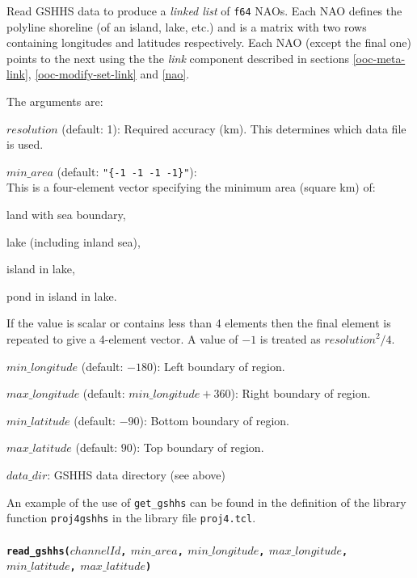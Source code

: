Read GSHHS data to produce a {\em linked list} of \texttt{f64} NAOs.
Each NAO defines the polyline shoreline (of an island, lake, etc.)
and is a matrix with two rows containing longitudes and latitudes respectively.
Each NAO (except the final one) points to the next using the
the {\em link} component described in sections
\ref{ooc-meta-link}, \ref{ooc-modify-set-link} and \ref{nao}.

The arguments are:
\begin{simpleitems}
\item $\mathit{resolution}$ (default: 1):
    Required accuracy (km).
    This determines which data file is used.
\item $\mathit{min\_area}$ (default: \texttt{"\{-1 -1 -1 -1\}"}): \\
This is a four-element vector specifying the minimum area (square km) of:
    \begin{bullets}
	\item land with sea boundary,
	\item lake (including inland sea),
	\item island in lake,
	\item pond in island in lake.
    \end{bullets}
If the value is scalar or contains less than 4 elements
then the final element is repeated to give a 4-element vector.
A value of $-1$ is treated as $\mathit{resolution}^2/4$.
\item $\mathit{min\_longitude}$ (default: $-180$):
    Left boundary of region. 
\item $\mathit{max\_longitude}$ (default: $\mathit{min\_longitude} + 360$):
    Right boundary of region.
\item $\mathit{min\_latitude}$ (default: $-90$):
    Bottom boundary of region.
\item $\mathit{max\_latitude}$ (default: $90$):
    Top boundary of region.
\item $\mathit{data\_dir}$:
    GSHHS data directory (see above)
\end{simpleitems}

An example of the use of \texttt{get\_gshhs}
can be found in the definition of the library function \texttt{proj4gshhs} in the library
file \texttt{proj4.tcl}.

\paragraph{\texttt{read\_gshhs(}$\mathit{channelId}$\texttt{,} 
$\mathit{min\_area}$\texttt{,} 
$\mathit{min\_longitude}$\texttt{,} 
$\mathit{max\_longitude}$\texttt{,} 
$\mathit{min\_latitude}$\texttt{,} 
$\mathit{max\_latitude}$\texttt{)}\\}
    \label{geog-read-gshhs}

